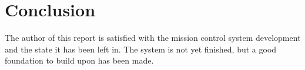 \section{Conclusion}\label{sec:conclusion}
The author of this report is satisfied with the mission control system development and the state it has been left in. The system is not yet finished, but a good foundation to build upon has been made.